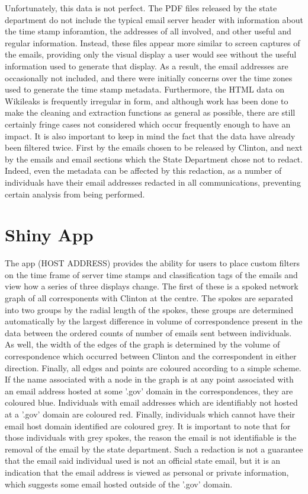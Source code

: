 \documentclass[journal]{vgtc}                %
\begin{document}
Unfortunately, this data is not perfect. The PDF files released by the state department do not include the typical email server header with information about the time stamp inforamtion, the addresses of all involved, and other useful and regular information. Instead, these files appear more similar to screen captures of the emails, providing only the visual display a user would see without the useful information used to generate that display. As a result, the email addresses are occasionally not included, and there were initially concerns over the time zones used to generate the time stamp metadata. Furthermore, the HTML data on Wikileaks is frequently irregular in form, and although work has been done to make the cleaning and extraction functions as general as possible, there are still certainly fringe cases not considered which occur frequently enough to have an impact. It is also important to keep in mind the fact that the data have already been filtered twice. First by the emails chosen to be released by Clinton, and next by the emails and email sections which the State Department chose not to redact. Indeed, even the metadata can be affected by this redaction, as a number of individuals have their email addresses redacted in all communications, preventing certain analysis from being performed.

\section{Shiny App}

The app (HOST ADDRESS) provides the ability for users to place custom filters on the time frame of server time stamps and classification tags of the emails and view how a series of three displays change. The first of these is a spoked network graph of all corresponents with Clinton at the centre. The spokes are separated into two groups by the radial length of the spokes, these groups are determined automatically by the largest difference in volume of correspondence present in the data between the ordered counts of number of emails sent between individuals. As well, the width of the edges of the graph is determined by the volume of correspondence which occurred between Clinton and the correspondent in either direction. Finally, all edges and points are coloured according to a simple scheme. If the name associated with a node in the graph is at any point associated with an email address hosted at some '.gov' domain in the correspondences, they are coloured blue. Individuals with email addresses which are identifiably not hosted at a '.gov' domain are coloured red. Finally, individuals which cannot have their email host domain identified are coloured grey. It is important to note that for those individuals with grey spokes, the reason the email is not identifiable is the removal of the email by the state department. Such a redaction is not a guarantee that the email said individual used is not an official state email, but it is an indication that the email address is viewed as personal or private information, which suggests some email hosted outside of the '.gov' domain.
\end{document}

